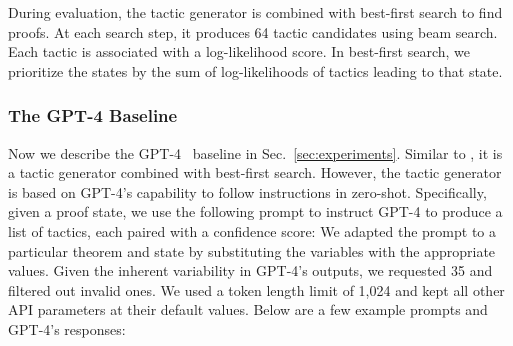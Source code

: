During evaluation, the tactic generator is combined with best-first search to find proofs. At each search step, it produces 64 tactic candidates using beam search. Each tactic is associated with a log-likelihood score. In best-first search, we prioritize the states by the sum of log-likelihoods of tactics leading to that state. 


\subsubsection{The GPT-4 Baseline}
\label{appendix:gpt-4}

Now we describe the GPT-4~\cite{openai2023gpt4} baseline in Sec.~\ref{sec:experiments}. Similar to {\name}, it is a tactic generator combined with best-first search. However, the tactic generator is based on GPT-4's capability to follow instructions in zero-shot. Specifically, given a proof state, we use the following prompt to instruct GPT-4 to produce a list of tactics, each paired with a confidence score:
{
\setlength{\fboxsep}{0.8em}
\noindent{}
}
We adapted the prompt to a particular theorem and state by substituting the variables with the appropriate values. Given the inherent variability in GPT-4's outputs, we requested 35 and filtered out invalid ones. We used a token length limit of 1,024 and kept all other API parameters at their default values. Below are a few example prompts and GPT-4's responses:

